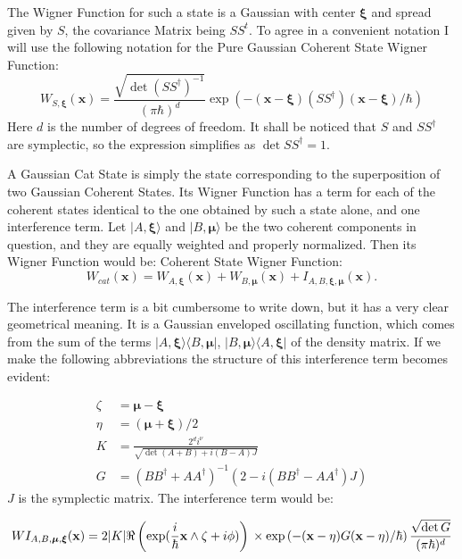 \documentclass[a4paper,12pt]{article}
\newcommand{\ihb}{\frac{i}{\hbar}}
\newcommand{\xfase}{\mathbf{x}}
\newcommand{\xifase}{ {\boldsymbol{\xi}} }
\newcommand{\mufase}{ {\boldsymbol{\mu}} }
\newcommand{\bra}[1]{\langle #1|}
\newcommand{\ket}[1]{|#1\rangle}
\begin{document}
The Wigner Function for such a state is a Gaussian
with center $\xifase$ and spread given by $S$, the covariance 
Matrix being $SS^t$. To agree in a convenient notation
I will use the following notation for the 
Pure Gaussian Coherent State Wigner Function:
\begin{equation}
W_{S,\xifase}(\xfase)=\frac{\sqrt{\det (SS^\dagger)^{-1}}}{(\pi\hbar)^d}
\exp(-(\xfase-\xifase)(SS^\dagger)(\xfase-\xifase)/\hbar)
\end{equation}
Here $d$ is the number of degrees of freedom. It shall be noticed
that $S$ and $SS^\dagger$ are symplectic, so the expression simplifies
as $\det SS^\dagger =1$. 


A Gaussian Cat State is simply the state corresponding
to the superposition of two Gaussian Coherent States.
Its Wigner Function has a term for each of the 
coherent states identical to the one obtained by such a state
alone, and one  interference term. Let $\ket{ A, \xifase}$
and $\ket{ B, \mufase}$ be the two coherent components in question,
and they are equally weighted and properly normalized.
Then its Wigner Function would be:
Coherent State Wigner Function:
\begin{equation}
W_{cat}(\xfase)=W_{A,\xifase}(\xfase)+W_{B,\mufase}(\xfase)+
I_{A,B,\xifase,\mufase}(\xfase).
\end{equation}

The interference term is a bit cumbersome to write down, but it has a 
very clear geometrical meaning. It is a Gaussian enveloped
oscillating function, which comes from the sum of the terms 
$\ket{A,\xifase} \bra{B, \mufase}$,
$\ket{B,\mufase} \bra{A, \xifase}$ of the density matrix. 
If we make the following abbreviations the structure of this
interference term becomes evident:

\begin{align}
\zeta & = \mufase-\xifase \\
\eta & = (\mufase+\xifase)/2 \\
K & =\frac{2^d i^\nu}{\sqrt{\det(A+B)+i(B-A)J}} \\
G & = (BB^\dagger+AA^\dagger)^{-1}(2-i(BB^\dagger -AA^\dagger)J)
\end{align}
$J$ is the symplectic matrix.
The interference term would be:

\begin{equation}
WI_{A,B,\mufase,\xifase}(\xfase)=
2 |K| \Re \left( \exp (\ihb \xfase \wedge \zeta +i\phi) \right) \\ 
\times \exp\left(-(\xfase-\eta)G(\xfase-\eta)/\hbar \right)
\frac{\sqrt{\det G}}{(\pi\hbar)^d}
\end{equation}
\end{document}
